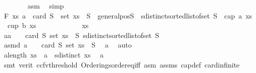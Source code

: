 \begin{isabellebody}
\ \ \ \ \ \ \isamarkupfalse%
\ asm\ \isamarkupfalse%
\ simp\isanewline
\ \ \ \ \isamarkupfalse%
\ F{}{\isacharcolon}{\kern0pt}\ {\isachardoublequoteopen}{\isasymforall}xs{\isachardot}{\kern0pt}\ {\isacharparenleft}{\kern0pt}a{\isacharminus}{\kern0pt}{}\ {\isacharequal}{\kern0pt}\ card\ S\ {\isasymand}\ set\ xs\ {\isasymsubseteq}\ S\ {\isasymand}\ general{\isacharunderscore}{\kern0pt}pos{\isacharparenleft}{\kern0pt}S{\isacharparenright}{\kern0pt}\ {\isasymand}\ sdistinct{\isacharparenleft}{\kern0pt}sorted{\isacharunderscore}{\kern0pt}list{\isacharunderscore}{\kern0pt}of{\isacharunderscore}{\kern0pt}set\ S{\isacharparenright}{\kern0pt}\ {\isasymlongrightarrow}\ {\isasymnot}{\isacharparenleft}{\kern0pt}cap\ a\ xs\ {\isasymor}\ cup\ b\ xs{\isacharparenright}{\kern0pt}{\isacharparenright}{\kern0pt}{\isachardoublequoteclose}\isanewline
\ \ \ \ \isamarkupfalse%
\isanewline
\ \ \ \ \ \ \isamarkupfalse%
\ xs\isanewline
\ \ \ \ \ \ \isakeywordONE{{\isacharbraceleft}{\kern0pt}}\isamarkupfalse%
\isanewline
\ \ \ \ \ \ \ \ \isamarkupfalse%
\ a{}{\isacharcolon}{\kern0pt}{\isachardoublequoteopen}a\ {\isacharminus}{\kern0pt}\ {}\ {\isacharequal}{\kern0pt}\ card\ S{\isachardoublequoteclose}\ {\isachardoublequoteopen}set\ xs\ {\isasymsubseteq}\ S{\isachardoublequoteclose}\ {\isachardoublequoteopen}sdistinct{\isacharparenleft}{\kern0pt}sorted{\isacharunderscore}{\kern0pt}list{\isacharunderscore}{\kern0pt}of{\isacharunderscore}{\kern0pt}set\ S{\isacharparenright}{\kern0pt}{\isachardoublequoteclose}\isanewline
\ \ \ \ \ \ \ \ \isamarkupfalse%
\ asmd{\isacharcolon}{\kern0pt}\ {\isachardoublequoteopen}a\ {\isacharminus}{\kern0pt}\ {}\ {\isacharequal}{\kern0pt}\ card\ S{\isachardoublequoteclose}\ {\isachardoublequoteopen}set\ xs\ {\isasymsubseteq}\ S{\isachardoublequoteclose}\ \isamarkupfalse%
\ a{}\ \isamarkupfalse%
\ auto\isanewline
\ \ \ \ \ \ \ \ \isamarkupfalse%
\ a{}{\isacharcolon}{\kern0pt}{\isachardoublequoteopen}length\ xs\ {\isachargreater}{\kern0pt}\ a{\isacharminus}{\kern0pt}{}\ {\isasymLongrightarrow}\ {\isasymnot}sdistinct\ xs{\isachardoublequoteclose}\ \isamarkupfalse%
\ a{}\isanewline
\ \ \ \ \ \ \ \ \ \ \isamarkupfalse%
\ {\isacharparenleft}{\kern0pt}smt\ {\isacharparenleft}{\kern0pt}verit{\isacharcomma}{\kern0pt}\ ccfv{\isacharunderscore}{\kern0pt}threshold{\isacharparenright}{\kern0pt}\ Orderings{\isachardot}{\kern0pt}order{\isacharunderscore}{\kern0pt}eq{\isacharunderscore}{\kern0pt}iff\ asm\ assms\ cap{\isacharunderscore}{\kern0pt}def\ card{\isachardot}{\kern0pt}infinite\isanewline

\end{isabellebody}
